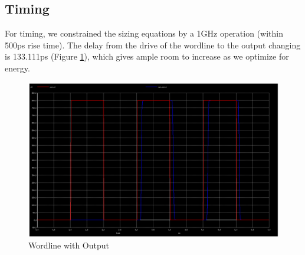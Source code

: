 \documentclass[a4paper]{article}
\begin{document}
\subsection{Timing}
For timing, we constrained the sizing equations by a 1GHz operation (within 500ps rise time). The delay from the drive of the wordline to the output changing is 133.111ps (Figure \ref{fig:ioTiming}), which gives ample room to increase as we optimize for energy.

\begin{figure}[H]
	\centering
	\includegraphics[scale=0.2]{exampleBitlineIOTiming}
	\caption{Wordline with Output}
	\label{fig:ioTiming}
\end{figure}



\end{document}
